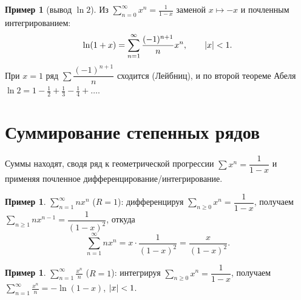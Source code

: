 \documentclass[11pt,a4paper]{article}
\theoremstyle{definition}
\newtheorem{example}[definition]{Пример}
\theoremstyle{plain}
\renewcommand{\ge}{\geqslant}
\DeclarePairedDelimiter{\abs}{\lvert}{\rvert}
\begin{document}
\begin{example}[вывод $\ln2$]
Из $\displaystyle\sum_{n=0}^\infty x^n=\frac1{1-x}$ заменой $x\mapsto-x$ и почленным
интегрированием:
\[
  \ln(1+x)=\sum_{n=1}^\infty\frac{(-1)^{n+1}}{n}x^n,\qquad \abs x<1 .
\]
При $x=1$ ряд $\sum\dfrac{(-1)^{n+1}}{n}$ сходится (Лейбниц), и по второй теореме Абеля
$\ln2=1-\tfrac12+\tfrac13-\tfrac14+\dots$.
\end{example}

\section{Суммирование степенных рядов}

Суммы находят, сводя ряд к геометрической прогрессии $\sum x^n=\dfrac1{1-x}$ и применяя почленное
дифференцирование/интегрирование.

\begin{example}
$\displaystyle\sum_{n=1}^\infty n x^n$ ($R=1$): дифференцируя $\sum_{n\ge0}x^n=\dfrac1{1-x}$,
получаем $\sum_{n\ge1}n x^{n-1}=\dfrac1{(1-x)^2}$, откуда
\[
  \sum_{n=1}^\infty n x^n=x\cdot\frac{1}{(1-x)^2}=\frac{x}{(1-x)^2}.
\]
\end{example}

\begin{example}
$\displaystyle\sum_{n=1}^\infty\frac{x^n}{n}$ ($R=1$): интегрируя $\sum_{n\ge0}x^n=\dfrac1{1-x}$,
получаем $\displaystyle\sum_{n=1}^\infty\frac{x^n}{n}=-\ln(1-x)$, $\abs x<1$.
\end{example}
\end{document}
